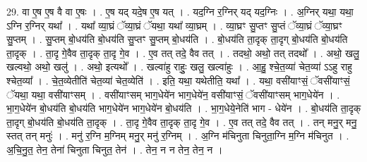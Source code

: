\documentclass[17pt]{extarticle}
\begin{document}
29. वा ए॒ष ए॒ष वै वा ए॒षः । . ए॒ष यद् यदे॒ष ए॒ष यत् । . यद॒ग्नि र॒ग्निर् यद् यद॒ग्निः । . अ॒ग्निर् यथा॒ यथा॒ ऽग्नि र॒ग्निर् यथा᳚ । . यथा᳚ व्या॒घ्रं ॅव्या॒घ्रं ॅयथा॒ यथा᳚ व्या॒घ्रम् । . व्या॒घ्रꣳ सु॒प्तꣳ सु॒प्तं ॅव्या॒घ्रं ॅव्या॒घ्रꣳ सु॒प्तम् । . सु॒प्तम् बो॒धय॑ति बो॒धय॑ति सु॒प्तꣳ सु॒प्तम् बो॒धय॑ति । . बो॒धय॑ति ता॒दृक् ता॒दृग् बो॒धय॑ति बो॒धय॑ति ता॒दृक् । . ता॒दृ गे॒वैव ता॒दृक् ता॒दृ गे॒व । . ए॒व तत् तदे॒ वैव तत् । . तदथो॒ अथो॒ तत् तदथो᳚ । . अथो॒ खलु॒ खल्वथो॒ अथो॒ खलु॑ । . अथो॒ इत्यथो᳚ । . खल्वा॑हु राहुः॒ खलु॒ खल्वा॑हुः । . आ॒हु॒ श्चे॒त॒व्या॑ चेत॒व्या॑ ऽऽहु राहु श्चेत॒व्या᳚ । . चे॒त॒व्येतीति॑ चेत॒व्या॑ चेत॒व्येति॑ । . इति॒ यथा॒ यथेतीति॒ यथा᳚ । . यथा॒ वसी॑याꣳसं॒ ॅवसी॑याꣳसं॒ ॅयथा॒ यथा॒ वसी॑याꣳसम् । . वसी॑याꣳसम् भाग॒धेये॑न भाग॒धेये॑न॒ वसी॑याꣳसं॒ ॅवसी॑याꣳसम् भाग॒धेये॑न । . भा॒ग॒धेये॑न बो॒धय॑ति बो॒धय॑ति भाग॒धेये॑न भाग॒धेये॑न बो॒धय॑ति । . भा॒ग॒धेये॒नेति॑ भाग - धेये॑न । . बो॒धय॑ति ता॒दृक् ता॒दृग् बो॒धय॑ति बो॒धय॑ति ता॒दृक् । . ता॒दृ गे॒वैव ता॒दृक् ता॒दृ गे॒व । . ए॒व तत् तदे॒ वैव तत् । . तन् मनु॒र् मनु॒ स्तत् तन् मनुः॑ । . मनु॑ र॒ग्नि म॒ग्निम् मनु॒र् मनु॑ र॒ग्निम् । . अ॒ग्नि म॑चिनुता चिनुता॒ग्नि म॒ग्नि म॑चिनुत । . अ॒चि॒नु॒त॒ तेन॒ तेना॑ चिनुता चिनुत॒ तेन॑ । . तेन॒ न न तेन॒ तेन॒ न । \newline
\end{document}
